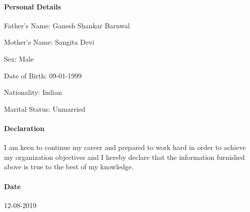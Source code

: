\documentclass{article}
\begin{document}
\paragraph{\textbf{Personal Details}}
	\begin{description}
		\item Father's Name: Ganesh Shankar Barnwal
		\item Mother's Name: Sangita Devi
		\item Sex: Male
		\item Date of Birth: 09-01-1999
		\item Nationality: Indian
		\item Marital Status: Unmarried
	\end{description}

\paragraph{\textbf{Declaration}}
I am keen to continue my career and prepared to work hard in order to achieve my organization objectives and I hereby declare that the information furnished above is true to the best of my knowledge.
\paragraph{\textbf{Date}}
12-08-2019
\end{document}
